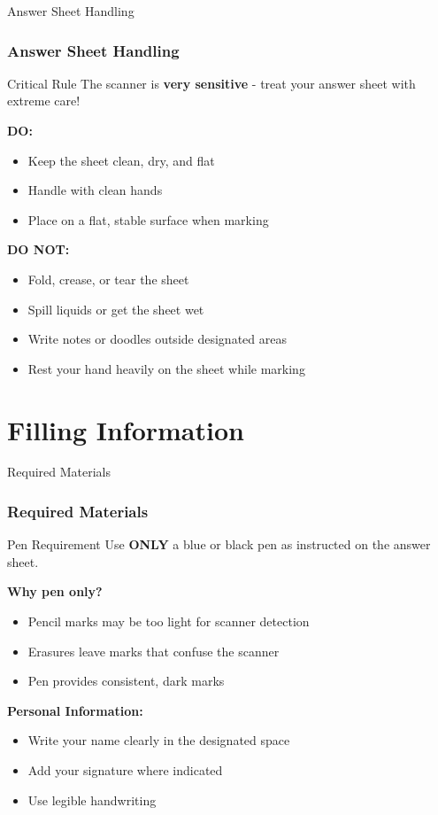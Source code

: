 \documentclass{beamer}
\begin{document}
\begin{frame}{Answer Sheet Handling}
\frametitle{Answer Sheet Handling}
\begin{block}{Critical Rule}
The scanner is \textbf{very sensitive} - treat your answer sheet with extreme care!
\end{block}

\textbf{DO:}
\begin{itemize}
\item Keep the sheet clean, dry, and flat
\item Handle with clean hands
\item Place on a flat, stable surface when marking
\end{itemize}

\textbf{DO NOT:}
\begin{itemize}
\item Fold, crease, or tear the sheet
\item Spill liquids or get the sheet wet
\item Write notes or doodles outside designated areas
\item Rest your hand heavily on the sheet while marking
\end{itemize}
\end{frame}

\section{Filling Information}

\begin{frame}{Required Materials}
\frametitle{Required Materials}
\begin{block}{Pen Requirement}
Use \textbf{ONLY} a blue or black pen as instructed on the answer sheet.
\end{block}

\textbf{Why pen only?}
\begin{itemize}
\item Pencil marks may be too light for scanner detection
\item Erasures leave marks that confuse the scanner
\item Pen provides consistent, dark marks
\end{itemize}

\textbf{Personal Information:}
\begin{itemize}
\item Write your name clearly in the designated space
\item Add your signature where indicated
\item Use legible handwriting
\end{itemize}
\end{frame}
\end{document}
